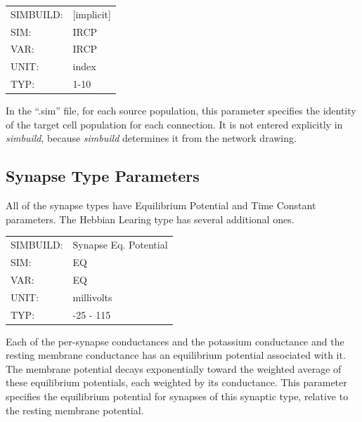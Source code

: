 \documentclass[12pt,openany,oneside]{book}
\newcommand{\prog}[1]{\textit{{#1}}}
\newcommand{\ext}[1]{{{``.#1''}}}
\begin{document}
\begin{flushleft}
\begin{tabular}{@{}ll@{}}
SIMBUILD: & [implicit]\\
SIM: & IRCP\\
VAR: & IRCP\\
UNIT: & index\\
TYP: & 1-10\\
\end{tabular}
\end{flushleft}
\noindent
In the \ext{sim} file, for each source population, this parameter
specifies the identity of the target cell population for each
connection. It is not entered explicitly in \prog{simbuild}, because \prog{simbuild}
determines it from the network drawing.
\filbreak
\vspace{\baselineskip}

\subsection{Synapse Type Parameters}
\label{Synapse Type Parameters}
All of the synapse types have Equilibrium Potential and Time Constant
parameters. The Hebbian Learing type has several additional ones.

\begin{flushleft}
\begin{tabular}{@{}ll@{}}
SIMBUILD: & Synapse Eq. Potential\\
SIM: & EQ\\
VAR: & EQ\\
UNIT: & millivolts\\
TYP: & -25 - 115\\
\end{tabular}
\end{flushleft}
\noindent
Each of the per-synapse conductances and the potassium conductance and
the resting membrane conductance has an equilibrium potential
associated with it. The membrane potential decays exponentially
toward the weighted average of these equilibrium potentials, each
weighted by its conductance. This parameter specifies the equilibrium
potential for synapses of this synaptic type, relative to the resting
membrane potential.
\filbreak
\vspace{\baselineskip}
\end{document}
